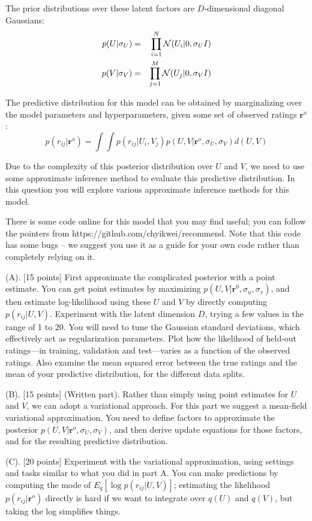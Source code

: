 \documentclass[12pt]{article}
\newcommand{\rr}{\mathbf{r}}
\begin{document}
The prior distributions over these latent factors are 
$D$-dimensional diagonal Gaussians:
\begin{eqnarray}
p(U|\sigma_U) &=& \prod_{i=1}^N {\cal N}(U_i|0,\sigma_U I) \\
p(V|\sigma_V) &=& \prod_{j=1}^M {\cal N}(U_j|0,\sigma_V I) 
\end{eqnarray}

The predictive distribution for this model can
be obtained by marginalizing
over the model parameters and hyperparameters, given some
set of observed ratings $\rr^o$:
\[
p(r_{ij}|\rr^o) = \int \int p(r_{ij}|U_i,V_j) 
  p(U,V|\rr^o,\sigma_U,\sigma_V) d(U,V) 
\]

Due to the complexity of this posterior distribution over
$U$ and $V$, we need
to use some approximate inference method to evaluate
this predictive distribution. In this question you will
explore various approximate inference methods for this model.

There is some code online for this model that you may find useful;
you can follow the pointers from
https://github.com/chyikwei/recommend. Note that this code has
some bugs -- we suggest you use it as a guide for your own code rather
than completely relying on it.

(A). [15 points] 
First approximate the complicated posterior with a point estimate.
You can get point estimates by maximizing
$p(U,V|\rr^0, \sigma_u, \sigma_v)$, and then 
estimate log-likelihood using
these $U$ and $V$ by directly computing $p(r_{ij}|U,V)$.
Experiment with the latent dimension $D$, trying a
few values
in the range of 1 to 20.  You will need to tune the Gaussian
standard deviations, which effectively act as regularization
parameters. Plot how the likelihood of held-out
ratings---in training, validation and test---varies as
a function of the observed ratings.  Also examine the
mean squared error between the true ratings and the
mean of your predictive distribution, for the different
data splits.

(B). [15 points] (Written part). Rather than simply using 
point estimates for $U$ and $V$, we can 
adopt a variational approach. For this part we suggest
a mean-field variational approximation.
You need to define factors to approximate the posterior
$p(U,V|\rr^o,\sigma_U,\sigma_V)$, and then derive
update equations for those factors, and for the 
resulting predictive distribution.

(C). [20 points] 
Experiment with the variational approximation, using 
settings and tasks similar to what you did in part A.
You can make predictions by computing the mode of 
$E_q[\log p(r_{ij}|U,V)]$; 
 estimating the likelihood $p(r_{ij}|\rr^o)$ directly is hard if we want
to integrate over $q(U)$ and $q(V)$, but taking the log simplifies things.
\end{document}
